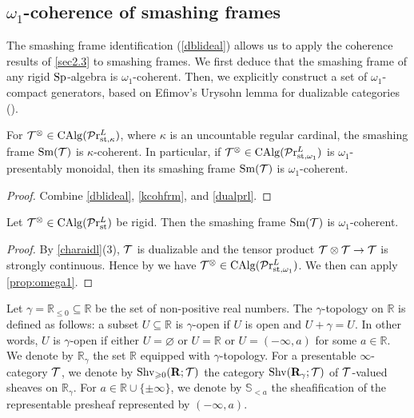 \documentclass[10pt,a4paper,oneside]{article}
\begin{document}
\subsection{$\omega_1$-coherence of smashing frames}
The smashing frame identification (\cref{dblideal}) allows us to apply the coherence results of \cref{sec2.3} to smashing frames. We first deduce that the smashing frame of any rigid $\operatorname{Sp}$-algebra is $\omega_1$-coherent. Then, we explicitly construct a set of $\omega_1$-compact generators, based on Efimov's Urysohn lemma for dualizable categories (\cite[Theorem D.1]{efimov2024k}).

\begin{prop}\label{prop:omega1}
For $\mathcal{T}^\otimes\in\operatorname{CAlg}(\mathcal{P}\mathrm{r}^L_{\operatorname{st},\kappa})$, where $\kappa$ is an uncountable regular cardinal, the smashing frame $\operatorname{Sm}(\mathcal{T})$ is $\kappa$-coherent. 
In particular, if $\mathcal{T}^\otimes\in\operatorname{CAlg}(\mathcal{P}\mathrm{r}^L_{\operatorname{st},\omega_1})$ is %
$\omega_1$-presentably monoidal, then its smashing frame $\operatorname{Sm}(\mathcal{T})$ is $\omega_1$-coherent.
\end{prop}

\begin{proof}
Combine \cref{dblideal}, \cref{kcohfrm}, and \cref{dualprl}.
\end{proof}

\begin{cor}
Let $\mathcal{T}^\otimes\in\operatorname{CAlg}(\mathcal{P}\mathrm{r}_{\operatorname{st}}^L)$ be rigid. Then the smashing frame $\operatorname{Sm}(\mathcal{T})$ is $\omega_1$-coherent.
\end{cor}

\begin{proof}
By \cref{charaidl}(3), $\mathcal{T}$ is dualizable and the tensor product $\mathcal{T}\otimes\mathcal{T}\to\mathcal{T}$ is strongly continuous. Hence by \cite[Corollary 2.36]{ramzi2024dualizable} we have $\mathcal{T}^\otimes\in\operatorname{CAlg}(\mathcal{P}\mathrm{r}^L_{\operatorname{st},\omega_1})$. We then can apply \cref{prop:omega1}.
\end{proof}

\begin{de}
Let $\gamma=\mathbb{R}_{\leqslant 0} \subseteq \mathbb{R}$ be the set of non-positive real numbers. The $\gamma$-topology %
on $\mathbb{R}$ is defined as follows: a subset $U \subseteq \mathbb{R}$ is $\gamma$-open if $U$ is open and $U+\gamma=U$. In other words, $U$ is $\gamma$-open if either $U=\varnothing$ or $U=\mathbb{R}$ or $U=(-\infty, a)$ for some $a \in \mathbb{R}$. We denote by $\mathbb{R}_\gamma$ the set $\mathbb{R}$ equipped with $\gamma$-topology. For a presentable $\infty$-category $\mathcal{T}$, we denote by $\operatorname{Shv}_{\geqslant 0}(\mathbf{R};\mathcal{T})$ the category $\operatorname{Shv}(\mathbf{R}_\gamma ; \mathcal{T})$ of $\mathcal{T}$-valued sheaves on $\mathbb{R}_\gamma$. For $a\in \mathbb{R}\cup \{\pm\infty\}$, we denote by $\mathbb{S}_{<a}$ the sheafification of the representable presheaf represented by $(-\infty,a)$.
\end{de}
\end{document}
